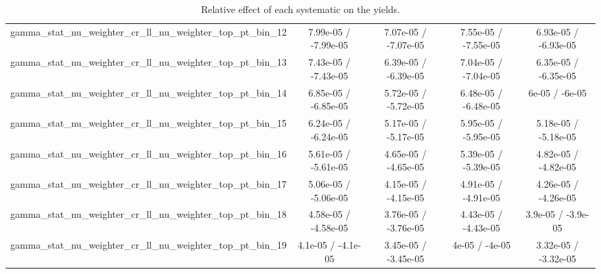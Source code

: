 \documentclass[10pt]{article}
\begin{document}
\begin{table}[htbp]
\begin{center}
\begin{tabular}{|c|c|c|c|c|}
  gamma_stat_nu_weighter_cr_ll_nu_weighter_top_pt_bin_12 & 7.99e-05 / -7.99e-05 & 7.07e-05 / -7.07e-05 & 7.55e-05 / -7.55e-05 & 6.93e-05 / -6.93e-05 \\ 
  gamma_stat_nu_weighter_cr_ll_nu_weighter_top_pt_bin_13 & 7.43e-05 / -7.43e-05 & 6.39e-05 / -6.39e-05 & 7.04e-05 / -7.04e-05 & 6.35e-05 / -6.35e-05 \\ 
  gamma_stat_nu_weighter_cr_ll_nu_weighter_top_pt_bin_14 & 6.85e-05 / -6.85e-05 & 5.72e-05 / -5.72e-05 & 6.48e-05 / -6.48e-05 & 6e-05 / -6e-05 \\ 
  gamma_stat_nu_weighter_cr_ll_nu_weighter_top_pt_bin_15 & 6.24e-05 / -6.24e-05 & 5.17e-05 / -5.17e-05 & 5.95e-05 / -5.95e-05 & 5.18e-05 / -5.18e-05 \\ 
  gamma_stat_nu_weighter_cr_ll_nu_weighter_top_pt_bin_16 & 5.61e-05 / -5.61e-05 & 4.65e-05 / -4.65e-05 & 5.39e-05 / -5.39e-05 & 4.82e-05 / -4.82e-05 \\ 
  gamma_stat_nu_weighter_cr_ll_nu_weighter_top_pt_bin_17 & 5.06e-05 / -5.06e-05 & 4.15e-05 / -4.15e-05 & 4.91e-05 / -4.91e-05 & 4.26e-05 / -4.26e-05 \\ 
  gamma_stat_nu_weighter_cr_ll_nu_weighter_top_pt_bin_18 & 4.58e-05 / -4.58e-05 & 3.76e-05 / -3.76e-05 & 4.43e-05 / -4.43e-05 & 3.9e-05 / -3.9e-05 \\ 
  gamma_stat_nu_weighter_cr_ll_nu_weighter_top_pt_bin_19 & 4.1e-05 / -4.1e-05 & 3.45e-05 / -3.45e-05 & 4e-05 / -4e-05 & 3.32e-05 / -3.32e-05 \\ 
\hline 
\end{tabular} 
\caption{Relative effect of each systematic on the yields.} 
\end{center} 
\end{table} 
\end{document}
